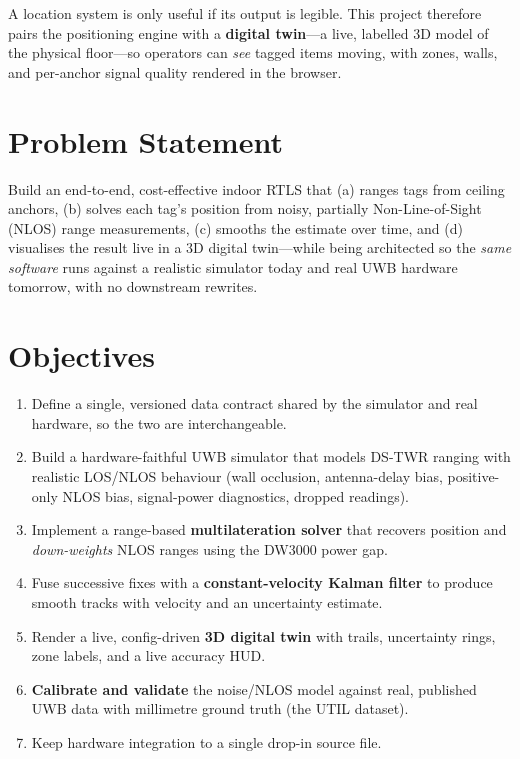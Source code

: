 \documentclass[a4paper,12pt,onecolumn]{report}
\begin{document}
A location system is only useful if its output is legible. This project therefore
pairs the positioning engine with a \textbf{digital twin}---a live, labelled 3D
model of the physical floor---so operators can \emph{see} tagged items moving,
with zones, walls, and per-anchor signal quality rendered in the browser.

\section{Problem Statement}
Build an end-to-end, cost-effective indoor RTLS that (a) ranges tags from
ceiling anchors, (b) solves each tag's position from noisy, partially
Non-Line-of-Sight (NLOS) range measurements, (c) smooths the estimate over time,
and (d) visualises the result live in a 3D digital twin---while being
architected so the \emph{same software} runs against a realistic simulator today
and real UWB hardware tomorrow, with no downstream rewrites.

\section{Objectives}
\begin{enumerate}[nosep]
  \item Define a single, versioned data contract shared by the simulator and real
        hardware, so the two are interchangeable.
  \item Build a hardware-faithful UWB simulator that models DS-TWR ranging with
        realistic LOS/NLOS behaviour (wall occlusion, antenna-delay bias,
        positive-only NLOS bias, signal-power diagnostics, dropped readings).
  \item Implement a range-based \textbf{multilateration solver} that recovers
        position and \emph{down-weights} NLOS ranges using the DW3000 power gap.
  \item Fuse successive fixes with a \textbf{constant-velocity Kalman filter} to
        produce smooth tracks with velocity and an uncertainty estimate.
  \item Render a live, config-driven \textbf{3D digital twin} with trails,
        uncertainty rings, zone labels, and a live accuracy HUD.
  \item \textbf{Calibrate and validate} the noise/NLOS model against real,
        published UWB data with millimetre ground truth (the UTIL dataset).
  \item Keep hardware integration to a single drop-in source file.
\end{enumerate}
\end{document}
